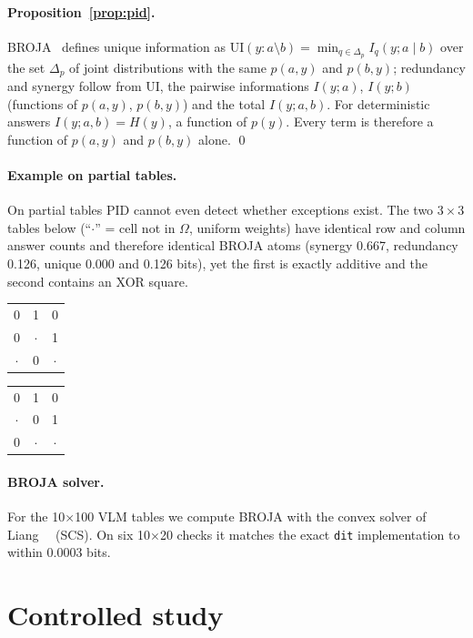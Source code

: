 \paragraph{Proposition~\ref{prop:pid}.}
BROJA~\cite{bertschinger2014quantifying} defines unique information as
$\mathrm{UI}(y{:}a\setminus b)=\min_{q\in\Delta_p} I_q(y;a\mid b)$ over the set $\Delta_p$ of joint
distributions with the same $p(a,y)$ and $p(b,y)$; redundancy and synergy follow from UI, the
pairwise informations $I(y;a)$, $I(y;b)$ (functions of $p(a,y)$, $p(b,y)$) and the total
$I(y;a,b)$. For deterministic answers $I(y;a,b)=H(y)$, a function of $p(y)$. Every term is
therefore a function of $p(a,y)$ and $p(b,y)$ alone. \qed

\paragraph{Example on partial tables.}
On partial tables PID cannot even detect whether exceptions exist. The two $3\times3$ tables
below (``$\cdot$'' = cell not in $\Omega$, uniform weights) have identical row and column
answer counts and therefore identical BROJA atoms (synergy 0.667, redundancy 0.126, unique
0.000 and 0.126 bits), yet the first is exactly additive and the second contains an XOR square.
\begin{center}\small
\begin{tabular}{ccc}0&1&0\\0&$\cdot$&1\\$\cdot$&0&$\cdot$\end{tabular}
\qquad\qquad
\begin{tabular}{ccc}0&1&0\\$\cdot$&0&1\\0&$\cdot$&$\cdot$\end{tabular}
\end{center}

\paragraph{BROJA solver.}
For the 10$\times$100 VLM tables we compute BROJA with the convex solver of
Liang~\etal~\cite{liang2023quantifying} (SCS). On six 10$\times$20 checks it matches the exact
\texttt{dit} implementation to within 0.0003 bits.

\section{Controlled study}
\label{sup:controlled}

